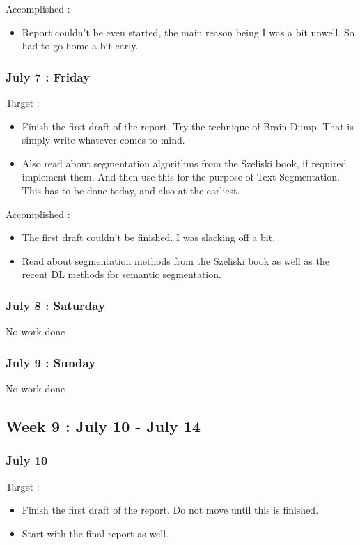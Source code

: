 \documentclass{article}
\begin{document}
Accomplished :
\begin{itemize}
\item Report couldn't be even started, the main reason being I was a bit unwell. So had to go home a bit early.
\end{itemize}

\subsubsection{July 7 : Friday}
Target :
\begin{itemize}
\item Finish the first draft of the report. Try the technique of Brain Dump. That is simply write whatever comes to mind.
\item Also read about segmentation algorithms from the Szeliski book, if required implement them. And then use this for the purpose of Text Segmentation. This has to be done today, and also at the earliest.
\end{itemize}

Accomplished :
\begin{itemize}
\item The first draft couldn't be finished. I was slacking off a bit.
\item Read about segmentation methods from the Szeliski book as well as the recent DL methods for semantic segmentation.
\end{itemize}

\subsubsection{July 8 : Saturday}
No work done

\subsubsection{July 9 : Sunday}
No work done

\subsection{Week 9 : July 10 - July 14}
\subsubsection{July 10}
Target :
\begin{itemize}
\item Finish the first draft of the report. Do not move until this is finished.
\item Start with the final report as well.
\end{itemize}
\end{document}
